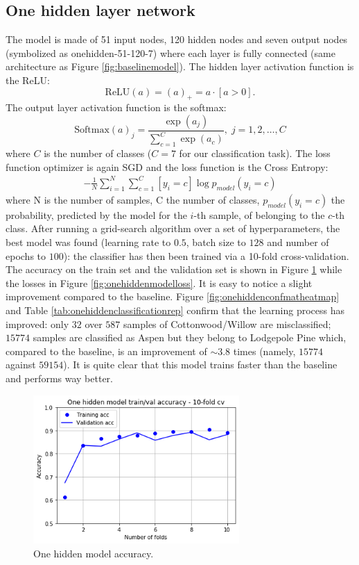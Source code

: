 \subsection{One hidden layer network}
\label{sec:onehidden}
The model is made of 51 input nodes, 120 hidden nodes and seven output nodes (symbolized as onehidden-51-120-7) where each layer is fully connected (same architecture as Figure \ref{fig:baselinemodel}). The hidden layer activation function is the ReLU:
\begin{equation}
\text{ReLU}(a) = (a)_+ = a\cdot[a>0].
\end{equation}
The output layer activation function is the softmax:
\begin{equation}
\text{Softmax}(a)_j = \frac{\exp(a_j)}{\sum_{c=1}^{C} \exp(a_c)}, \; j = 1,2,\dots,C 
\end{equation}
where $C$ is the number of classes ($C=7$ for our classification task). The loss function optimizer is again SGD and the loss function is the Cross Entropy:
\begin{equation}
\begin{aligned}
- \frac{1}{N} \sum_{i=1}^{N}\sum_{c=1}^{C} [y_i = c] \log p_{model}(y_i = c)
\end{aligned}
\end{equation}
where N is the number of samples, C the number of classes, $p_{model}(y_i = c)$ the probability, predicted by the model for the $i$-th sample, of belonging to the $c$-th class. After running a grid-search algorithm over a set of hyperparameters, the best model was found (learning rate to $0.5$, batch size to $128$ and number of epochs to $100$): the classifier has then been trained via a 10-fold cross-validation. The accuracy on the train set and the validation set is shown in Figure \ref{fig:onehiddenmodelacc} while the losses in Figure \ref{fig:onehiddenmodelloss}. It is easy to notice a slight improvement compared to the baseline. Figure \ref{fig:onehiddenconfmatheatmap} and Table \ref{tab:onehiddenclassificationrep} confirm that the learning process has improved: only $32$ over $587$ samples of Cottonwood/Willow are misclassified; $15774$ samples are classified as Aspen but they belong to Lodgepole Pine which, compared to the baseline, is an improvement of $\sim3.8$ times (namely, $15774$ against $59154$). It is quite clear that this model trains faster than the baseline and performs way better.
\begin{figure}
\centering
\includegraphics[width=0.7\textwidth]{./TeX_files/img/onehiddenmodelacc.png}
\caption{One hidden model accuracy.}
\label{fig:onehiddenmodelacc}
\end{figure}
